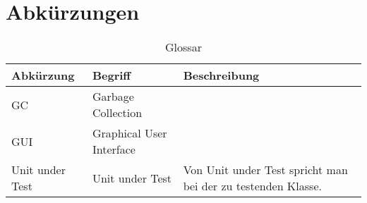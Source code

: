 \chapter*{Abkürzungen}\label{abkuerzungen}
  \begin{longtable}{|p{3cm}|p{5cm}|p{6cm}|}
      \caption{Glossar}\\
\hline
  \textbf{Abkürzung} &\textbf{Begriff} &  \textbf{Beschreibung} \\\hline
  GC & Garbage Collection & \\\hline
GUI & Graphical User Interface & \\\hline
Unit under Test & Unit under Test & Von Unit under Test spricht man bei der zu testenden Klasse.\\\hline
  \end{longtable}



